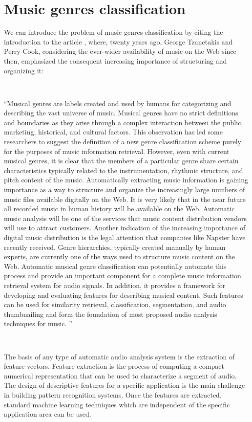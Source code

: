 \documentclass[english, LaM, oneside, noexaminfo]{sapthesis}
\begin{document}
\section{Music genres classification}

We can introduce the problem of music genres classification by citing the introduction to the article \cite{tzanetakis2002musical}, where, twenty years ago, George Tzanetakis and Perry Cook, considering the ever-wider availability of music on the Web since then, emphasized the consequent increasing importance of structuring and organizing it:

\

“Musical genres are labels created and used by humans
for categorizing and describing the vast universe of
music. Musical genres have no strict definitions and boundaries
as they arise through a complex interaction between the public,
marketing, historical, and cultural factors. This observation
has led some researchers to suggest the definition of a new
genre classification scheme purely for the purposes of music
information retrieval. However, even with current musical
genres, it is clear that the members of a particular genre share
certain characteristics typically related to the instrumentation,
rhythmic structure, and pitch content of the music.
Automatically extracting music information is gaining importance
as a way to structure and organize the increasingly
large numbers of music files available digitally on the Web. It is
very likely that in the near future all recorded music in human
 history will be available on the Web. Automatic music analysis will be one of the services that music content distribution vendors
will use to attract customers. Another indication of the increasing
importance of digital music distribution is the legal attention
that companies like Napster have recently received.
Genre hierarchies, typically created manually by human experts,
are currently one of the ways used to structure music content
on the Web. Automatic musical genre classification can potentially
automate this process and provide an important component
for a complete music information retrieval system for
audio signals. In addition, it provides a framework for developing
and evaluating features for describing musical content.
Such features can be used for similarity retrieval, classification,
segmentation, and audio thumbnailing and form the foundation
of most proposed audio analysis techniques for music. ” 

\

The basis of any type of automatic audio analysis system is the extraction of feature vectors. Feature extraction is the process of computing a compact numerical representation that can be used to characterize a segment of audio. The design of descriptive features for a specific application is the main challenge in building pattern recognition systems. Once the features are extracted, standard machine learning techniques which are independent of the specific application area can be used. 
\end{document}
